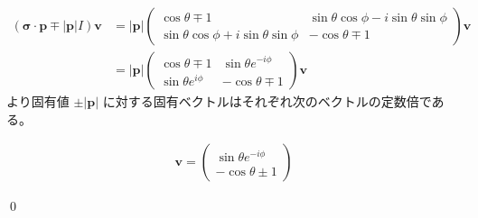 \documentclass[uplatex,dvipdfmx,a4paper,11pt]{jlreq}
\makeatletter
\theoremstyle{definition}
\renewenvironment{proof}[1][\proofname]{\par
  \normalfont
  \topsep6\p@\@plus6\p@ \trivlist
  \item[\hskip\labelsep{\bfseries #1}\@addpunct{\bfseries}]\ignorespaces\quad\par
}{%
  \qed\endtrivlist\@endpefalse
}
\renewcommand\proofname{証明}
\newcommand{\pp}{\bm{p}}
\numberwithin{equation}{section}
\makeatother
\begin{document}
\begin{proof}
  \begin{align}
    (\bm{\sigma}\cdot\pp \mp |\pp|I)\bm{v} & = |\pp|\begin{pmatrix}
                                                      \cos\theta \mp 1                         & \sin\theta\cos\phi - i\sin\theta\sin\phi \\
                                                      \sin\theta\cos\phi + i\sin\theta\sin\phi & -\cos\theta \mp 1
                                                    \end{pmatrix}\bm{v} \\
                                           & = |\pp|\begin{pmatrix}
                                                      \cos\theta \mp 1     & \sin\theta e^{-i\phi} \\
                                                      \sin\theta e^{i\phi} & -\cos\theta \mp 1
                                                    \end{pmatrix}\bm{v}
  \end{align}
  より固有値 $\pm|\pp|$ に対する固有ベクトルはそれぞれ次のベクトルの定数倍である。

  \begin{align}
    \bm{v} = \begin{pmatrix}
               \sin\theta e^{-i\phi} \\
               -\cos\theta \pm 1
             \end{pmatrix}
  \end{align}

\end{proof}
\end{document}
